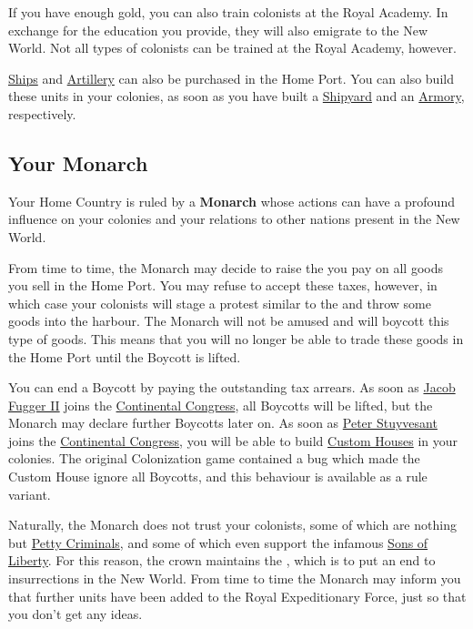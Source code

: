 \documentclass[12pt]{article}
\begin{document}
If you have enough gold, you can also train colonists at the
\hypertarget{Royal Academy}{Royal Academy}. In exchange for the
education you provide, they will also emigrate to the New World. Not
all types of colonists can be trained at the Royal Academy, however.

\hyperlink{Naval Units}{Ships} and \hyperlink{Artillery}{Artillery}
can also be purchased in the Home Port. You can also build these units
in your colonies, as soon as you have built a
\hyperlink{Shipyard}{Shipyard} and an \hyperlink{Armory}{Armory},
respectively.


\hypertarget{Monarch}{\subsection{Your Monarch}}

Your Home Country is ruled by a \textbf{Monarch} whose actions can
have a profound influence on your colonies and your relations to other
nations present in the New World. 

From time to time, the Monarch may decide to raise the
 you pay on all goods you sell in the Home
Port. You may refuse to accept these taxes, however, in which case
your colonists will stage a protest similar to the  and throw some goods into the harbour. The Monarch will not be
amused and will  \hypertarget{Boycotts}{boycott} this
type of goods. This means that you will no longer be able to trade
these goods in the Home Port until the Boycott is lifted.

You can end a Boycott by paying the outstanding tax arrears. As soon
as \hyperlink{Jacob Fugger II}{Jacob Fugger II} joins the
\hyperlink{Continental Congress}{Continental Congress}, all Boycotts
will be lifted, but the Monarch may declare further Boycotts later
on. As soon as \hyperlink{Peter Stuyvesant}{Peter Stuyvesant} joins
the \hyperlink{Continental Congress}{Continental Congress}, you will
be able to build \hyperlink{Custom House}{Custom Houses} in your
colonies. The original Colonization game contained a bug which made
the Custom House ignore all Boycotts, and this behaviour is available
as a rule variant.

Naturally, the Monarch does not trust your colonists, some of which
are nothing but \hyperlink{Petty Criminal}{Petty Criminals}, and some
of which even support the infamous \hyperlink{Sons of Liberty}{Sons of
Liberty}. For this reason, the crown maintains the
, which is to put an end to
insurrections in the New World. From time to time the Monarch may
inform you that further units have been added to the Royal
Expeditionary Force, just so that you don't get any ideas.
\end{document}
